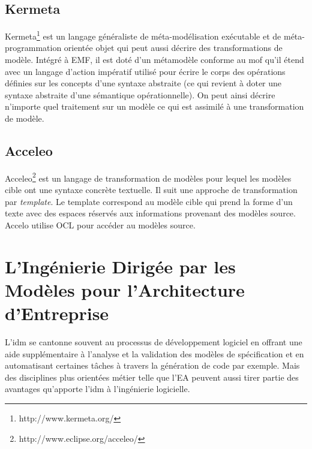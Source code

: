 \subsection{Kermeta}
Kermeta\footnote{http://www.kermeta.org/} est un langage généraliste de méta-modélisation exécutable et de 
méta-programmation orientée objet qui peut aussi décrire des transformations de 
modèle. Intégré à EMF, il est doté d'un métamodèle conforme au \gls{mof} qu'il étend 
avec un langage d'action impératif utilisé pour écrire le corps des opérations 
définies sur les concepts d'une syntaxe abstraite (ce qui revient à doter une 
syntaxe abstraite d'une sémantique opérationnelle). On peut ainsi décrire 
n'importe quel traitement sur un modèle ce qui est assimilé à une transformation 
de modèle.


\subsection{Acceleo}
Acceleo\footnote{http://www.eclipse.org/acceleo/} est un langage de transformation de modèles pour lequel les modèles cible ont une syntaxe concrète textuelle. Il suit une approche de transformation par \textit{template}. Le template correspond au modèle cible qui prend la forme d'un texte avec des espaces réservés aux informations provenant des modèles source. Accelo utilise OCL pour accéder au modèles source.  

\section{L'Ingénierie Dirigée par les Modèles pour l'Architecture d'Entreprise}

L'\gls{idm} se cantonne souvent au processus de développement logiciel en offrant une aide supplémentaire à l'analyse et la validation des modèles de spécification et en automatisant certaines tâches à travers la génération de code par exemple. Mais des disciplines plus orientées métier telle que l'EA peuvent aussi tirer partie des avantages qu'apporte l'\gls{idm} à l'ingénierie logicielle. 

